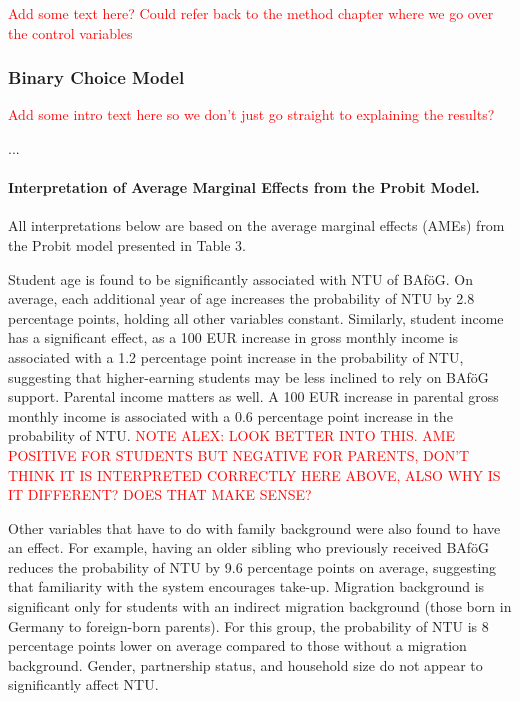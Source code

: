 \textcolor{red}{Add some text here? Could refer back to the method chapter where we go over the control variables}

\subsubsection{Binary Choice Model}







\textcolor{red}{Add some intro text here so we don't just go straight to explaining the results?}

...

\paragraph{Interpretation of Average Marginal Effects from the Probit Model.} All interpretations below are based on the average marginal effects (AMEs) from the Probit model presented in Table 3.

Student age is found to be significantly associated with NTU of BAföG. On average, each additional year of age increases the probability of NTU by 2.8 percentage points, holding all other variables constant. Similarly, student income has a significant effect, as a 100 EUR increase in gross monthly income is associated with a 1.2 percentage point increase in the probability of NTU, suggesting that higher-earning students may be less inclined to rely on BAföG support. Parental income matters as well. A 100 EUR increase in parental gross monthly income is associated with a 0.6 percentage point increase in the probability of NTU. \textcolor{red}{NOTE ALEX: LOOK BETTER INTO THIS. AME POSITIVE FOR STUDENTS BUT NEGATIVE FOR PARENTS, DON’T THINK IT IS INTERPRETED CORRECTLY HERE ABOVE, ALSO WHY IS IT DIFFERENT? DOES THAT MAKE SENSE?}

Other variables that have to do with family background were also found to have an effect. For example, having an older sibling who previously received BAföG reduces the probability of NTU by 9.6 percentage points on average, suggesting that familiarity with the system encourages take-up. Migration background is significant only for students with an indirect migration background (those born in Germany to foreign-born parents). For this group, the probability of NTU is 8 percentage points lower on average compared to those without a migration background.  Gender, partnership status, and household size do not appear to significantly affect NTU.

